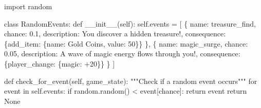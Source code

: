 \documentclass[
  letterpaper,
  DIV=11,
  numbers=noendperiod,
  oneside]{scrreprt}
\newenvironment{Shaded}{}{}
\newcommand{\CommentTok}[1]{\textcolor[rgb]{0.42,0.45,0.49}{#1}}
\newcommand{\ControlFlowTok}[1]{\textcolor[rgb]{0.84,0.23,0.29}{#1}}
\newcommand{\DecValTok}[1]{\textcolor[rgb]{0.00,0.36,0.77}{#1}}
\newcommand{\FloatTok}[1]{\textcolor[rgb]{0.00,0.36,0.77}{#1}}
\newcommand{\FunctionTok}[1]{\textcolor[rgb]{0.44,0.26,0.76}{#1}}
\newcommand{\ImportTok}[1]{\textcolor[rgb]{0.01,0.18,0.38}{#1}}
\newcommand{\KeywordTok}[1]{\textcolor[rgb]{0.84,0.23,0.29}{#1}}
\newcommand{\NormalTok}[1]{\textcolor[rgb]{0.14,0.16,0.18}{#1}}
\newcommand{\OperatorTok}[1]{\textcolor[rgb]{0.14,0.16,0.18}{#1}}
\newcommand{\StringTok}[1]{\textcolor[rgb]{0.01,0.18,0.38}{#1}}
\newcommand{\VariableTok}[1]{\textcolor[rgb]{0.89,0.38,0.04}{#1}}
\begin{document}
\begin{Shaded}
\begin{Highlighting}[]
\ImportTok{import}\NormalTok{ random}

\KeywordTok{class}\NormalTok{ RandomEvents:}
    \KeywordTok{def} \FunctionTok{\_\_init\_\_}\NormalTok{(}\VariableTok{self}\NormalTok{):}
        \VariableTok{self}\NormalTok{.events }\OperatorTok{=}\NormalTok{ [}
\NormalTok{            \{}
                \StringTok{\textquotesingle{}name\textquotesingle{}}\NormalTok{: }\StringTok{\textquotesingle{}treasure\_find\textquotesingle{}}\NormalTok{,}
                \StringTok{\textquotesingle{}chance\textquotesingle{}}\NormalTok{: }\FloatTok{0.1}\NormalTok{,}
                \StringTok{\textquotesingle{}description\textquotesingle{}}\NormalTok{: }\StringTok{\textquotesingle{}You discover a hidden treasure!\textquotesingle{}}\NormalTok{,}
                \StringTok{\textquotesingle{}consequence\textquotesingle{}}\NormalTok{: \{}\StringTok{\textquotesingle{}add\_item\textquotesingle{}}\NormalTok{: \{}\StringTok{\textquotesingle{}name\textquotesingle{}}\NormalTok{: }\StringTok{\textquotesingle{}Gold Coins\textquotesingle{}}\NormalTok{, }\StringTok{\textquotesingle{}value\textquotesingle{}}\NormalTok{: }\DecValTok{50}\NormalTok{\}\}}
\NormalTok{            \},}
\NormalTok{            \{}
                \StringTok{\textquotesingle{}name\textquotesingle{}}\NormalTok{: }\StringTok{\textquotesingle{}magic\_surge\textquotesingle{}}\NormalTok{,}
                \StringTok{\textquotesingle{}chance\textquotesingle{}}\NormalTok{: }\FloatTok{0.05}\NormalTok{,}
                \StringTok{\textquotesingle{}description\textquotesingle{}}\NormalTok{: }\StringTok{\textquotesingle{}A wave of magic energy flows through you!\textquotesingle{}}\NormalTok{,}
                \StringTok{\textquotesingle{}consequence\textquotesingle{}}\NormalTok{: \{}\StringTok{\textquotesingle{}player\_change\textquotesingle{}}\NormalTok{: \{}\StringTok{\textquotesingle{}magic\textquotesingle{}}\NormalTok{: }\OperatorTok{+}\DecValTok{20}\NormalTok{\}\}}
\NormalTok{            \}}
\NormalTok{        ]}
    
    \KeywordTok{def}\NormalTok{ check\_for\_event(}\VariableTok{self}\NormalTok{, game\_state):}
        \CommentTok{"""Check if a random event occurs"""}
        \ControlFlowTok{for}\NormalTok{ event }\KeywordTok{in} \VariableTok{self}\NormalTok{.events:}
            \ControlFlowTok{if}\NormalTok{ random.random() }\OperatorTok{\textless{}}\NormalTok{ event[}\StringTok{\textquotesingle{}chance\textquotesingle{}}\NormalTok{]:}
                \ControlFlowTok{return}\NormalTok{ event}
        \ControlFlowTok{return} \VariableTok{None}
\end{Highlighting}
\end{Shaded}
\end{document}
